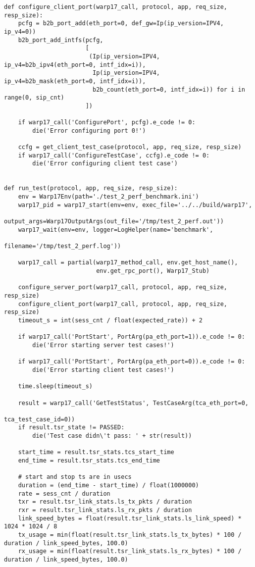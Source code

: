 \begin{landscape}
\begin{verbatim}
def configure_client_port(warp17_call, protocol, app, req_size, resp_size):
    pcfg = b2b_port_add(eth_port=0, def_gw=Ip(ip_version=IPV4, ip_v4=0))
    b2b_port_add_intfs(pcfg,
                       [
                        (Ip(ip_version=IPV4, ip_v4=b2b_ipv4(eth_port=0, intf_idx=i)),
                         Ip(ip_version=IPV4, ip_v4=b2b_mask(eth_port=0, intf_idx=i)),
                         b2b_count(eth_port=0, intf_idx=i)) for i in range(0, sip_cnt)
                       ])

    if warp17_call('ConfigurePort', pcfg).e_code != 0:
        die('Error configuring port 0!')

    ccfg = get_client_test_case(protocol, app, req_size, resp_size)
    if warp17_call('ConfigureTestCase', ccfg).e_code != 0:
        die('Error configuring client test case')


def run_test(protocol, app, req_size, resp_size):
    env = Warp17Env(path='./test_2_perf_benchmark.ini')
    warp17_pid = warp17_start(env=env, exec_file='../../build/warp17',
                              output_args=Warp17OutputArgs(out_file='/tmp/test_2_perf.out'))
    warp17_wait(env=env, logger=LogHelper(name='benchmark',
                                          filename='/tmp/test_2_perf.log'))

    warp17_call = partial(warp17_method_call, env.get_host_name(),
                          env.get_rpc_port(), Warp17_Stub)

    configure_server_port(warp17_call, protocol, app, req_size, resp_size)
    configure_client_port(warp17_call, protocol, app, req_size, resp_size)
    timeout_s = int(sess_cnt / float(expected_rate)) + 2

    if warp17_call('PortStart', PortArg(pa_eth_port=1)).e_code != 0:
        die('Error starting server test cases!')

    if warp17_call('PortStart', PortArg(pa_eth_port=0)).e_code != 0:
        die('Error starting client test cases!')

    time.sleep(timeout_s)

    result = warp17_call('GetTestStatus', TestCaseArg(tca_eth_port=0,
                                                      tca_test_case_id=0))
    if result.tsr_state != PASSED:
        die('Test case didn\'t pass: ' + str(result))

    start_time = result.tsr_stats.tcs_start_time
    end_time = result.tsr_stats.tcs_end_time

    # start and stop ts are in usecs
    duration = (end_time - start_time) / float(1000000)
    rate = sess_cnt / duration
    txr = result.tsr_link_stats.ls_tx_pkts / duration
    rxr = result.tsr_link_stats.ls_rx_pkts / duration
    link_speed_bytes = float(result.tsr_link_stats.ls_link_speed) * 1024 * 1024 / 8
    tx_usage = min(float(result.tsr_link_stats.ls_tx_bytes) * 100 / duration / link_speed_bytes, 100.0)
    rx_usage = min(float(result.tsr_link_stats.ls_rx_bytes) * 100 / duration / link_speed_bytes, 100.0)


\end{verbatim}
\end{landscape}
